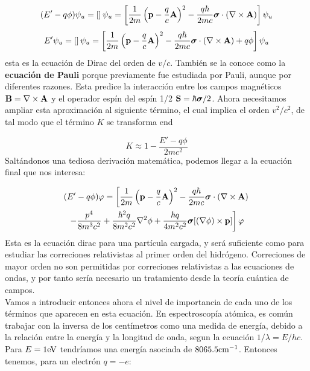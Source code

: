 \begin{equation}
    (E'-q\phi)\psi_u = \left[  \right]\psi_u = \left[ \frac{1}{2m}\left( \mathbf{p}- \frac{q}{c}\mathbf{A} \right)^2 - \frac{q\hbar}{2mc}\boldsymbol{\sigma} \cdot (\nabla \times \mathbf{A}) \right] \psi_u
\end{equation}
\begin{equation}
 E'\psi_u = \left[  \right]\psi_u = \left[ \frac{1}{2m}\left( \mathbf{p}- \frac{q}{c}\mathbf{A} \right)^2 - \frac{q\hbar}{2mc}\boldsymbol{\sigma} \cdot (\nabla \times \mathbf{A}) + q \phi \right] \psi_u
\end{equation}
esta es la ecuación de Dirac del orden de $v/c$. También se la conoce como la \textbf{ecuación de Pauli} porque previamente fue estudiada por Pauli, aunque por diferentes razones. Esta predice la interacción entre los campos magnéticos $\mathbf{B} = \nabla \times \mathbf{A}$ y el operador espín del espín 1/2 $\mathbf{S} = \hbar \boldsymbol{\sigma} /2$. Ahora necesitamos ampliar esta aproximación al siguiente término, el cual implica el orden $v^2/c^2$, de tal modo que el término $K$ se transforma end

\begin{equation}
    K \approx 1- \frac{E' - q \phi}{2mc^2}
\end{equation}
Saltándonos una tediosa derivación matemática, podemos llegar a la ecuación final que nos interesa:

\begin{multline}
    (E'-q\phi) \varphi = \left[ \frac{1}{2m} \left( \mathbf{p}-\frac{q}{c}\mathbf{A} \right)^2 - \frac{q\hbar}{2mc} \boldsymbol{\sigma} \cdot (\nabla \times \mathbf{A})  \right. \\
    \left. - \frac{p^4}{8 m^3 c^2} + \frac{\hbar^2 q}{8 m^2 c^2} \nabla^2 \phi + \frac{ \hbar q}{4m^2 c^2} \boldsymbol{\sigma} [(\nabla \phi)\times \mathbf{p}] \right] \varphi
\end{multline}
Esta es la ecuación dirac para una partícula cargada, y será suficiente como para estudiar las correciones relativistas al primer orden del hidrógeno. Correciones de mayor orden no son permitidas por correciones relativistas a las ecuaciones de ondas, y por tanto sería necesario un tratamiento desde la teoría cuántica de campos. \\

Vamos a introducir entonces ahora el nivel de importancia de cada uno de los términos que aparecen en esta ecuación. En espectroscopía atómica, es común trabajar con la inversa de los centímetros como una medida de energía, debido a la relación entre la energía y la longitud de onda, segun la ecuación $1/\lambda = E/hc$. Para $E=1\text{eV}$ tendríamos una energía asociada de $8065.5 \text{cm}^{-1}$. Entonces tenemos, para un electrón $q=-e$:

